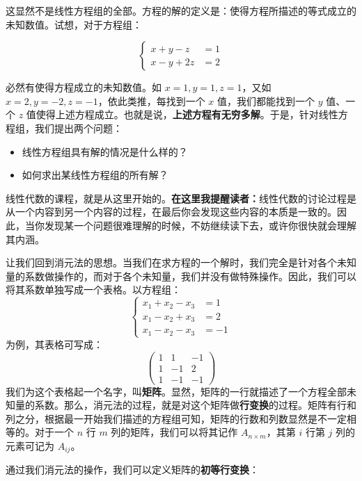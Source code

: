 \documentclass[b5paper]{ctexart}
\begin{document}
	这显然不是线性方程组的全部。方程的解的定义是：使得方程所描述的等式成立的未知数值。试想，对于方程组：
	
	\begin{equation*}
		\begin{cases}
			x + y - z &= 1 \\
			x - y + 2z &= 2 
		\end{cases}
	\end{equation*}
	
	必然有使得方程成立的未知数值。如 $x = 1, y = 1, z = 1$，又如 $x = 2, y = -2, z = -1$，依此类推，每找到一个 $x$ 值，我们都能找到一个 $y$ 值、一个 $z$ 值使得上述方程成立。也就是说，\textbf{上述方程有无穷多解}。于是，针对线性方程组，我们提出两个问题：
	\begin{itemize}
		\item 线性方程组具有解的情况是什么样的？
		
		\item 如何求出某线性方程组的所有解？
	\end{itemize}
	线性代数的课程，就是从这里开始的。\textbf{在这里我提醒读者：}线性代数的讨论过程是从一个内容到另一个内容的过程，在最后你会发现这些内容的本质是一致的。因此，当你发现某一个问题很难理解的时候，不妨继续读下去，或许你很快就会理解其内涵。
	
	让我们回到消元法的思想。当我们在求方程的一个解时，我们完全是针对各个未知量的系数做操作的，而对于各个未知量，我们并没有做特殊操作。因此，我们可以将其系数单独写成一个表格。以方程组：
	\begin{equation*}
		\begin{cases}
			x_1 + x_2 - x_3 &= 1 \\
			x_1 - x_2 + x_3 &= 2 \\
			x_1 - x_2 - x_3 & = -1
		\end{cases}
	\end{equation*}
	为例，其表格可写成：
	\[
	\begin{pmatrix}
		1 & 1 & -1 \\
		1 & -1 & 2 \\
		1 & -1 & -1
	\end{pmatrix}
	\]
	我们为这个表格起一个名字，叫\textbf{矩阵}。显然，矩阵的一行就描述了一个方程全部未知量的系数。那么，消元法的过程，就是对这个矩阵做\textbf{行变换}的过程。矩阵有行和列之分，根据最一开始我们描述的方程组可知，矩阵的行数和列数显然是不一定相等的。对于一个 $n$ 行 $m$ 列的矩阵，我们可以将其记作 $A_{n \times m}$，其第 $i$ 行第 $j$ 列的元素可记为 $A_{ij}$。
	
	通过我们消元法的操作，我们可以定义矩阵的\textbf{初等行变换}：
	
\end{document}
